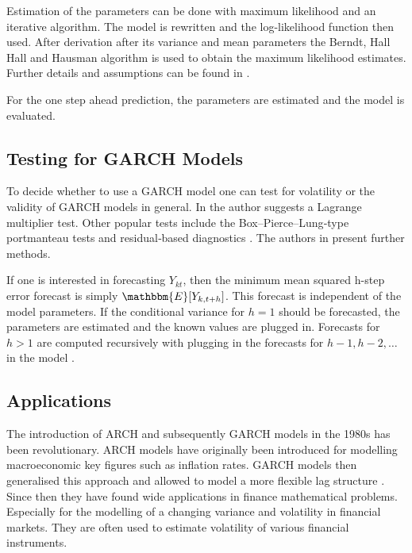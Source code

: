 Estimation of the parameters can be done with maximum likelihood and an iterative algorithm. The model is rewritten and the log-likelihood function then used. After derivation after its variance and mean parameters the Berndt, Hall Hall and Hausman algorithm \cite{Berndt:1974}is used to obtain the maximum likelihood estimates. Further details and assumptions can be found in \cite{Bollerslev:1986}. 

For the one step ahead prediction, the parameters are estimated and the model is evaluated. 

\subsection{Testing for GARCH Models}
\label{sec: Testing for GARCH models}

To decide whether to use a GARCH model one can test for volatility or the validity of GARCH models in general. In \cite{Bollerslev:1986} the author suggests a Lagrange multiplier test. Other popular tests include the Box–Pierce–Lung‐type portmanteau tests and residual‐based diagnostics \cite{Hong:2017}. The authors in \cite{Hong:2017} present further methods. 

If one is interested in forecasting $Y_{kt}$, then the minimum mean squared h-step error forecast is simply $\mathbbm{E}[Y_{k,t+h}]$. This forecast is independent of the model parameters. If the conditional variance for $h=1$ should be forecasted, the parameters are estimated and the known values are plugged in. Forecasts for $h>1$ are computed recursively with plugging in the forecasts for $h-1,h-2,\ldots$ in the model \cite{Zivot:2009}. 

\subsection{Applications}
\label{sec: Garch Applications}

The introduction of ARCH and subsequently GARCH models in the 1980s has been revolutionary. ARCH models have originally been introduced for modelling  macroeconomic key figures such as inflation rates. GARCH models then generalised this approach and allowed to model a more flexible lag structure \cite{Bollerslev:1986}. Since then they have found wide applications in finance mathematical problems. Especially for the modelling of a changing variance and volatility in financial markets. They are often used to estimate volatility of various financial instruments. 

